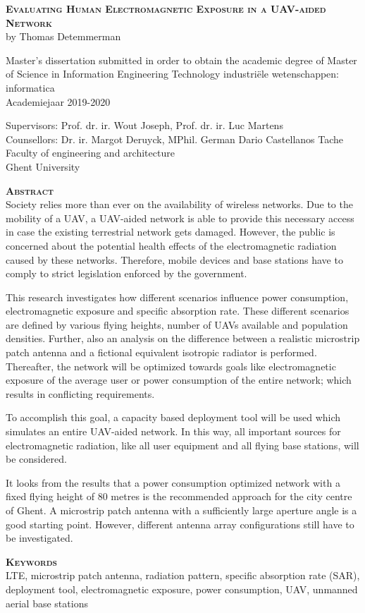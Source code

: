 \begin{center}
\textsc{\textbf{\Huge Evaluating Human Electromagnetic Exposure in a UAV-aided Network}}\\
by Thomas Detemmerman

Master's dissertation submitted in order to obtain the academic degree of Master of Science in Information Engineering Technology
industri\"ele wetenschappen: informatica\\
Academiejaar 2019-2020

Supervisors: Prof. dr. ir. Wout Joseph, Prof. dr. ir. Luc Martens\\
Counsellors: Dr. ir. Margot Deruyck, MPhil. German Dario Castellanos Tache\\
Faculty of engineering and architecture\\
Ghent University
\end{center}
\textsc{\textbf{\LARGE Abstract}}\\
Society relies more than ever on the availability of wireless networks.
Due to the mobility of a UAV, a UAV-aided network is able to provide this necessary access in case the existing terrestrial network gets damaged.
However,  the public is 
concerned about the potential health effects of the electromagnetic radiation caused by these networks.
Therefore, mobile devices and base stations have to comply to strict legislation enforced by the government.

This research investigates how different scenarios influence power consumption, electromagnetic exposure and specific absorption rate.
These different scenarios are defined by various flying heights, number of UAVs available and population densities. Further, also 
an analysis on the difference
between a realistic microstrip patch antenna and a fictional equivalent isotropic radiator is performed.
Thereafter, the network will be optimized towards goals like electromagnetic exposure of the average user or 
power consumption of the entire network; which results in conflicting requirements.

To accomplish this goal, a capacity based deployment tool will be used which simulates an entire UAV-aided network.
In this way, all important sources for electromagnetic radiation, like all user equipment and all flying base stations, 
will be considered.

It looks from the results that a power consumption optimized network with a fixed flying height of 80 metres is the recommended approach
for the city centre of Ghent.
A microstrip patch 
antenna with a sufficiently large aperture angle is a good starting point. However, different antenna array configurations still have to 
be investigated.

\textsc{\textbf{\LARGE Keywords}}\\
LTE, microstrip patch antenna, radiation pattern, specific absorption rate (SAR),
deployment tool, electromagnetic exposure, power consumption, UAV, unmanned aerial base stations
